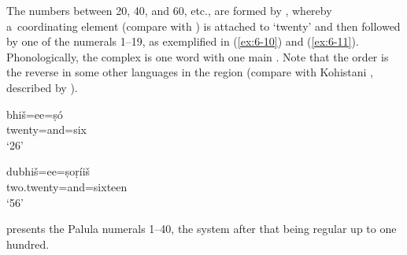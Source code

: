 The numbers between 20, 40, and 60, etc., are formed by , whereby a~coordinating element (compare with ) is attached to `twenty' and then followed by one of the numerals 1--19, as exemplified in (\ref{ex:6-10}) and (\ref{ex:6-11}). Phonologically, the complex is one word with one main . Note that the order is the reverse in some other languages in the region (compare with Kohistani \iliGawri, described by \citealt[57]{baart1999a}).

\begin{exe}
\ex
\label{ex:6-10}
\gll bhiš=ee=ṣó \\
twenty=and=six \\
\glt `26'

\ex
\label{ex:6-11}
\gll dubhiš=ee=ṣoṛíiš \\
two.twenty=and=sixteen \\
\glt `56'
\end{exe}

 presents the Palula numerals 1--40, the system after that being regular up to one hundred.



